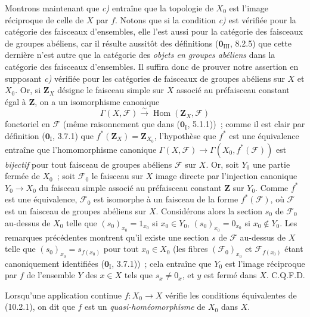 Montrons maintenant que \emph{c)} entraîne que la topologie de $X_0$ est
l'image réciproque de celle de $X$ par $f$. Notons que si la condition
\emph{c)} est vérifiée pour la catégorie des faisceaux d'ensembles, elle l'est
aussi pour la catégorie des faisceaux de groupes abéliens, car il résulte
aussitôt des définitions ($\mathbf 0_{\mathrm{III}}$, 8.2.5) que cette dernière
n'est autre que la catégorie des \emph{objets en groupes abéliens} dans la
catégorie des faisceaux d'ensembles. Il suffira donc de prouver notre assertion
en supposant \emph{c)} vérifiée pour les catégories de faisceaux de groupes
abéliens sur $X$ et $X_0$. Or, si $\mathbf Z_X$ désigne le faisceau simple sur
$X$ associé au préfaisceau constant égal à $\mathbf Z$, on a un isomorphisme
canonique
\[
\Gamma(X,\mathcal F)\xrightarrow{\sim}\operatorname{Hom}(\mathbf Z_X,\mathcal F)
\]
fonctoriel en $\mathcal F$ (même raisonnement que dans
($\mathbf 0_{\mathrm I}$, 5.1.1))~; comme il est clair par définition
($\mathbf 0_{\mathrm I}$, 3.7.1) que $f^*(\mathbf Z_X)=\mathbf Z_{X_0}$,
l'hypothèse que $f^*$ est une équivalence entraîne que l'homomorphisme
canonique $\Gamma(X,\mathcal F)\to\Gamma(X_0,f^*(\mathcal F))$ est
\emph{bijectif} pour tout faisceau de groupes abéliens $\mathcal F$ sur $X$.
Or, soit $Y_0$ une partie fermée de $X_0$~; soit $\mathcal F_0$ le faisceau
sur $X$ image directe par l'injection canonique $Y_0\to X_0$ du faisceau
simple associé au préfaisceau constant $\mathbf Z$ sur $Y_0$. Comme $f^*$ est
une équivalence, $\mathcal F_0$ est isomorphe à un faisceau de la forme
$f^*(\mathcal F)$, où $\mathcal F$ est un faisceau de groupes abéliens sur
$X$. Considérons alors la section $s_0$ de $\mathcal F_0$ au-dessus de $X_0$
telle que $(s_0)_{x_0}=1_{x_0}$ si $x_0\in Y_0$,
$(s_0)_{x_0}=0_{x_0}$ si $x_0\notin Y_0$. Les remarques précédentes montrent
qu'il existe une section $s$ de $\mathcal F$ au-dessus de $X$ telle que
$(s_0)_{x_0}=s_{f(x_0)}$ pour tout $x_0\in X_0$ (les fibres
$(\mathcal F_0)_{x_0}$ et $\mathcal F_{f(x_0)}$ étant canoniquement
identifiées ($\mathbf 0_{\mathrm I}$, 3.7.1))~; cela entraîne que $Y_0$ est
l'image réciproque par $f$ de l'ensemble $Y$ des $x\in X$ tels que
$s_x\neq0_x$, et $y$ est fermé dans $X$. C.Q.F.D.

\begin{definition}[10.2.2]
\label{IV.10.2.2-fr}
Lorsqu'une application continue $f:X_0\to X$ vérifie les conditions
équivalentes de (10.2.1), on dit que $f$ est un \emph{quasi-homéomorphisme} de
$X_0$ dans $X$.
\end{definition}

